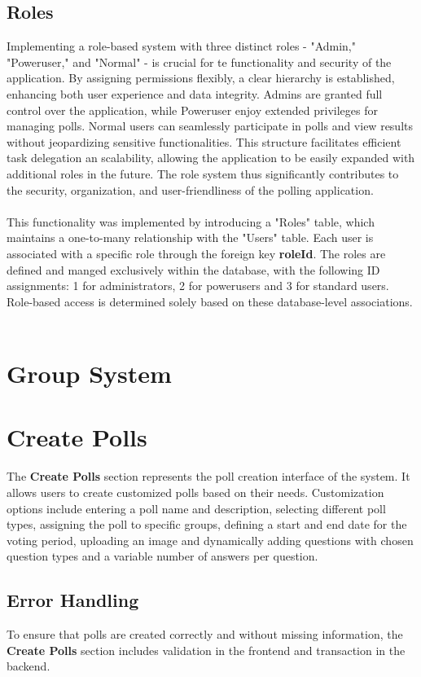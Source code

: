 \documentclass[a4paper,12pt]{report}
\begin{document}
\subsection{Roles}
Implementing a role-based system with three distinct roles - "Admin," "Poweruser," and "Normal" - is crucial for te functionality and security of the application. By assigning permissions flexibly, a clear hierarchy is established, enhancing both user experience and data integrity. Admins are granted full control over the application, while Poweruser enjoy extended privileges for managing polls. Normal users can seamlessly participate in polls and view results without jeopardizing sensitive functionalities. This structure facilitates efficient task delegation an scalability, allowing the application to be easily expanded with additional roles  in the future. The role system thus significantly contributes to the security, organization, and user-friendliness of the polling application.\\\\


This functionality was implemented by introducing a "Roles" table, which maintains a one-to-many relationship with the "Users" table. Each user is associated with a specific role through the foreign key \textbf{roleId}. The roles are defined and manged exclusively within the database, with the following ID assignments: 1 for administrators, 2 for powerusers and 3 for standard users. Role-based access is determined solely based on these database-level associations.\\\\


\section{Group System}

\section{Create Polls}
The \textbf{Create Polls} section represents the poll creation interface of the system. It allows users to create customized polls based on their needs. Customization options include entering a poll name and description, selecting different poll types, assigning the poll to specific groups, defining a start and end date for the voting period, uploading an image and dynamically adding questions with chosen question types and a variable number of answers per question.
\subsection{Error Handling}
To ensure that polls are created correctly and without missing information, the \textbf{Create Polls} section includes validation in the frontend and transaction in the backend.
\end{document}
